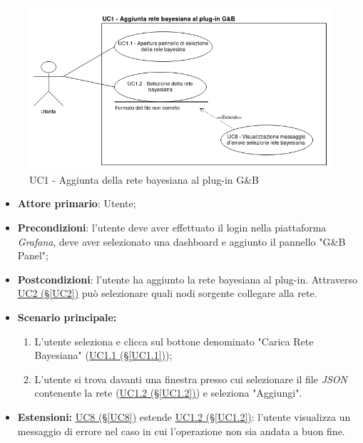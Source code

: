 \begin{figure}[H]
	\begin{center}
		\includegraphics[scale=0.5]{./images/UC1.png}
		 \caption{UC1 - Aggiunta della rete bayesiana al plug-in G\&B}	
	\end{center}
\end{figure}
\begin{itemize}
	\item \textbf{Attore primario}: Utente;
	\item \textbf{Precondizioni}: l'utente deve aver effettuato il login nella piattaforma \textit{Grafana}, deve aver selezionato una dashboard e aggiunto il pannello "G\&B Panel";
	\item \textbf{Postcondizioni}: l'utente ha aggiunto la rete bayesiana al plug-in. Attraverso \hyperref[UC2]{UC2 (§\ref*{UC2})} può selezionare quali nodi sorgente collegare alla rete.
	\item \textbf{Scenario principale:}
	\begin{enumerate}
		\item L'utente seleziona e clicca sul bottone denominato "Carica Rete Bayesiana" (\hyperref[UC1.1]{UC1.1 (§\ref*{UC1.1})});
		\item L'utente si trova davanti una finestra presso cui selezionare il file \textit{JSON} contenente la rete (\hyperref[UC1.2]{UC1.2 (§\ref*{UC1.2})}) e seleziona "Aggiungi".
	\end{enumerate}
	\item \textbf{Estensioni:} \hyperref[UC8]{UC8 (§\ref*{UC8})} estende \hyperref[UC1.2]{UC1.2 (§\ref*{UC1.2})}: l'utente visualizza un messaggio di errore nel caso in cui l'operazione non sia andata a buon fine.
\end{itemize}

